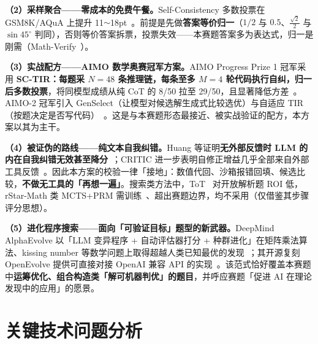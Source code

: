\documentclass[11pt, a4paper]{ctexart}
\newcommand{\hl}[1]{\textcolor{accentred}{\textbf{#1}}}
\begin{document}
\textbf{（2）采样聚合——零成本的免费午餐。}Self-Consistency 多数投票在 GSM8K/AQuA 上提升 11$\sim$18pt~\cite{sc}。前提是先做\hl{答案等价归一}（$1/2$ 与 $0.5$、$\frac{\sqrt{2}}{2}$ 与 $\sin 45^\circ$ 判同），否则等价答案拆票，投票失效——本赛题答案多为表达式，归一是刚需（Math-Verify~\cite{mathverify}）。

\textbf{（3）实战配方——AIMO 数学奥赛冠军方案。}AIMO Progress Prize 1 冠军采用 \hl{SC-TIR：每题采 $N{=}48$ 条推理链，每条至多 $M{=}4$ 轮代码执行自纠，归一后多数投票}，将同模型成绩从纯 CoT 的 8/50 拉至 29/50，且显著降低方差~\cite{aimo1}。AIMO-2 冠军引入 GenSelect（让模型对候选解生成式比较选优）与自适应 TIR（按题决定是否写代码）~\cite{aimo2}。这是与本赛题形态最接近、被实战验证的配方，本方案以其为主干。

\textbf{（4）被证伪的路线——纯文本自我纠错。}Huang 等证明\hl{无外部反馈时 LLM 的内在自我纠错无效甚至降分}~\cite{selfcorrect}；CRITIC 进一步表明自修正增益几乎全部来自外部工具反馈~\cite{critic}。因此本方案的校验一律「接地」：数值代回、沙箱报错回填、候选比较，\hl{不做无工具的「再想一遍」}。搜索类方法中，ToT~\cite{tot} 对开放解析题 ROI 低，rStar-Math 类 MCTS+PRM 需训练~\cite{rstar}、超出赛题边界，均不采用（仅借鉴其步骤评分思想）。

\textbf{（5）进化程序搜索——面向「可验证目标」题型的新武器。}DeepMind AlphaEvolve 以「LLM 变异程序 + 自动评估器打分 + 种群进化」在矩阵乘法算法、kissing number 等数学问题上取得超越人类已知最优的发现~\cite{alphaevolve}；其开源复刻 OpenEvolve 提供可直接对接 OpenAI 兼容 API 的实现~\cite{openevolve}。该范式恰好覆盖本赛题中\hl{运筹优化、组合构造类「解可机器判优」的题目}，并呼应赛题「促进 AI 在理论发现中的应用」的愿景。

\section{关键技术问题分析}
\end{document}
